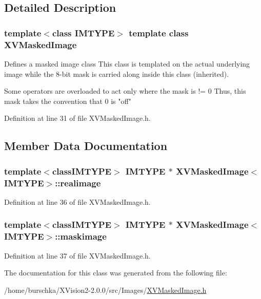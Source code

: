 \subsection{Detailed Description}
\subsubsection*{template$<$class IMTYPE$>$  template class XVMasked\-Image}

Defines a masked image class This class is templated on the actual underlying image while the 8-bit mask is carried along inside this class (inherited).

Some operators are overloaded to act only where the mask is != 0 Thus, this mask takes the convention that 0 is "off" 



Definition at line 31 of file XVMasked\-Image.h.

\subsection{Member Data Documentation}
\label{XVMaskedImage_m0}
\hypertarget{class_XVMaskedImage_m0}{
\subsubsection[realimage]{\setlength{\rightskip}{0pt plus 5cm}template$<$classIMTYPE$>$ IMTYPE $\ast$ XVMasked\-Image$<$IMTYPE$>$::realimage}}




Definition at line 36 of file XVMasked\-Image.h.\label{XVMaskedImage_m1}
\hypertarget{class_XVMaskedImage_m1}{
\subsubsection[maskimage]{\setlength{\rightskip}{0pt plus 5cm}template$<$classIMTYPE$>$ IMTYPE $\ast$ XVMasked\-Image$<$IMTYPE$>$::maskimage}}




Definition at line 37 of file XVMasked\-Image.h.

The documentation for this class was generated from the following file:\begin{CompactItemize}
\item 
/home/burschka/XVision2-2.0.0/src/Images/\hyperlink{XVMaskedImage.h-source}{XVMasked\-Image.h}\end{CompactItemize}
